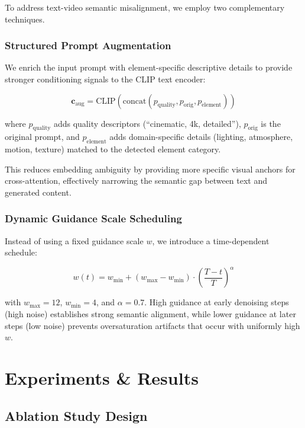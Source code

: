 \documentclass[conference]{IEEEtran}
\begin{document}
To address text-video semantic misalignment, we employ two complementary techniques.

\subsubsection{Structured Prompt Augmentation}
We enrich the input prompt with element-specific descriptive details to provide stronger conditioning signals to the CLIP text encoder:

\begin{equation}
    \mathbf{c}_{\text{aug}} = \text{CLIP}(\text{concat}(p_{\text{quality}}, p_{\text{orig}}, p_{\text{element}}))
\end{equation}

where $p_{\text{quality}}$ adds quality descriptors (``cinematic, 4k, detailed''), $p_{\text{orig}}$ is the original prompt, and $p_{\text{element}}$ adds domain-specific details (lighting, atmosphere, motion, texture) matched to the detected element category.

This reduces embedding ambiguity by providing more specific visual anchors for cross-attention, effectively narrowing the semantic gap between text and generated content.

\subsubsection{Dynamic Guidance Scale Scheduling}
Instead of using a fixed guidance scale $w$, we introduce a time-dependent schedule:

\begin{equation}
    w(t) = w_{\min} + (w_{\max} - w_{\min}) \cdot \left(\frac{T - t}{T}\right)^{\alpha}
\end{equation}

with $w_{\max} = 12$, $w_{\min} = 4$, and $\alpha = 0.7$. High guidance at early denoising steps (high noise) establishes strong semantic alignment, while lower guidance at later steps (low noise) prevents oversaturation artifacts that occur with uniformly high $w$.

\section{Experiments \& Results}

\subsection{Ablation Study Design}
\end{document}
